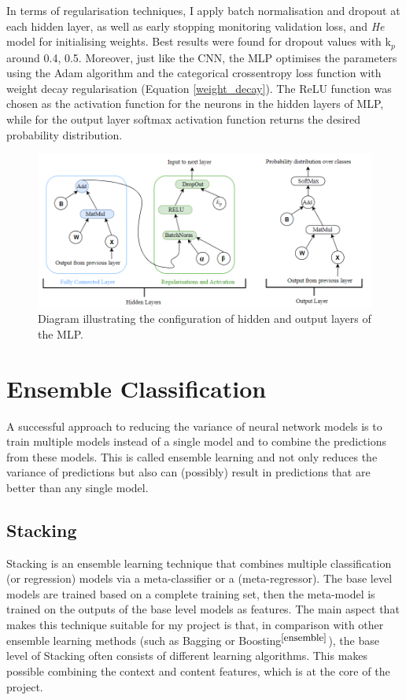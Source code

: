 In terms of regularisation techniques, I apply batch normalisation and dropout at each hidden layer, as well as early stopping monitoring validation loss, and \textit{He} model for initialising weights. Best results were found for dropout values with k$_p$ around 0.4, 0.5. Moreover, just like the CNN, the MLP optimises the parameters using the Adam algorithm and the categorical crossentropy loss function with weight decay regularisation (Equation \ref{weight_decay}). The ReLU function was chosen as the activation function for the neurons in the hidden layers of MLP, while for the output layer softmax activation function returns the desired probability distribution. 

\begin{figure}[H]
  \centering
  \centerline{\includegraphics[scale=0.5]{Images/mlp_layers.png}}
  \caption{Diagram illustrating the configuration of hidden and output layers of the MLP.}
  \label{mlp_layers}
\end{figure}


\section{Ensemble Classification}

A successful approach to reducing the variance of neural network models is to train multiple models instead of a single model and to combine the predictions from these models. This is called ensemble learning and not only reduces the variance of predictions but also can (possibly) result in predictions that are better than any single model. \\

\subsection{Stacking}

Stacking is an ensemble learning technique that combines multiple classification (or regression) models via a meta-classifier or a (meta-regressor). The base level models are trained based on a complete training set, then the meta-model is trained on the outputs of the base level models as features. The main aspect that makes this technique suitable for my project is that, in comparison with other ensemble learning methods (such as Bagging or Boosting$^{\small \cite{ensemble}}$), the base level of Stacking often consists of different learning algorithms. This makes possible combining the context and content features, which is at the core of the project.\\

